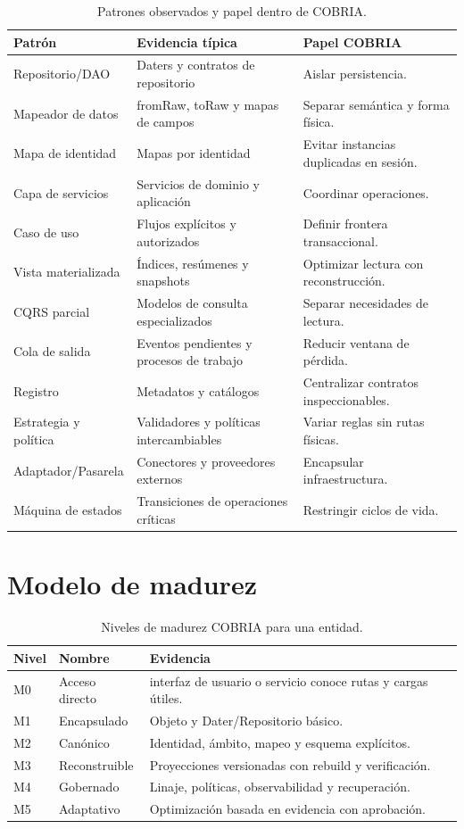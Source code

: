 \begin{table}[H]
\centering
\caption{Patrones observados y papel dentro de COBRIA.}
\label{tab:patrones-observados}
\begin{tabularx}{\textwidth}{p{3.4cm}p{4.2cm}X}
\toprule
Patrón & Evidencia típica & Papel COBRIA \\
\midrule
Repositorio/DAO & Daters y contratos de repositorio & Aislar persistencia.\\
Mapeador de datos & fromRaw, toRaw y mapas de campos & Separar semántica y forma física.\\
Mapa de identidad & Mapas por identidad & Evitar instancias duplicadas en sesión.\\
Capa de servicios & Servicios de dominio y aplicación & Coordinar operaciones.\\
Caso de uso & Flujos explícitos y autorizados & Definir frontera transaccional.\\
Vista materializada & Índices, resúmenes y snapshots & Optimizar lectura con reconstrucción.\\
CQRS parcial & Modelos de consulta especializados & Separar necesidades de lectura.\\
Cola de salida & Eventos pendientes y procesos de trabajo & Reducir ventana de pérdida.\\
Registro & Metadatos y catálogos & Centralizar contratos inspeccionables.\\
Estrategia y política & Validadores y políticas intercambiables & Variar reglas sin rutas físicas.\\
Adaptador/Pasarela & Conectores y proveedores externos & Encapsular infraestructura.\\
Máquina de estados & Transiciones de operaciones críticas & Restringir ciclos de vida.\\
\bottomrule
\end{tabularx}
\end{table}

\section{Modelo de madurez}

\begin{table}[H]
\centering
\caption{Niveles de madurez COBRIA para una entidad.}
\label{tab:madurez-cobria}
\begin{tabularx}{\textwidth}{p{1.5cm}p{3.2cm}X}
\toprule
Nivel & Nombre & Evidencia \\
\midrule
M0 & Acceso directo & interfaz de usuario o servicio conoce rutas y cargas útiles.\\
M1 & Encapsulado & Objeto y Dater/Repositorio básico.\\
M2 & Canónico & Identidad, ámbito, mapeo y esquema explícitos.\\
M3 & Reconstruible & Proyecciones versionadas con rebuild y verificación.\\
M4 & Gobernado & Linaje, políticas, observabilidad y recuperación.\\
M5 & Adaptativo & Optimización basada en evidencia con aprobación.\\
\bottomrule
\end{tabularx}
\end{table}

